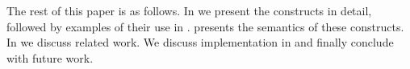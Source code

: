 The rest of this paper is as follows. In  we present the constructs in detail,
followed by examples of their use in .  presents the
semantics of these constructs.
In  we discuss
related work.
We discuss implementation in
 and finally conclude with future work.




